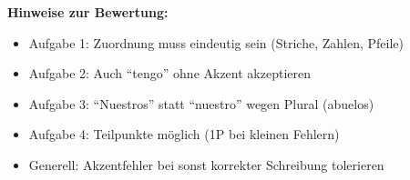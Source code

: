 \documentclass[11pt, a4paper]{article}
\begin{document}
\vspace{1em}

\textbf{Hinweise zur Bewertung:}
\begin{itemize}
    \item Aufgabe 1: Zuordnung muss eindeutig sein (Striche, Zahlen, Pfeile)
    \item Aufgabe 2: Auch ``tengo'' ohne Akzent akzeptieren
    \item Aufgabe 3: ``Nuestros'' statt ``nuestro'' wegen Plural (abuelos)
    \item Aufgabe 4: Teilpunkte möglich (1P bei kleinen Fehlern)
    \item Generell: Akzentfehler bei sonst korrekter Schreibung tolerieren
\end{itemize}
\end{document}
